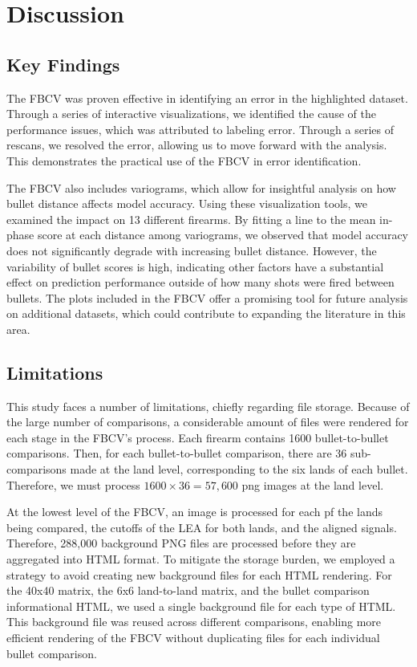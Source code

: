 \documentclass[
  12pt]{article}
\begin{document}
\section{Discussion}\label{discussion}

\subsection{Key Findings}\label{key-findings}

The FBCV was proven effective in identifying an error in the highlighted
dataset. Through a series of interactive visualizations, we identified
the cause of the performance issues, which was attributed to labeling
error. Through a series of rescans, we resolved the error, allowing us
to move forward with the analysis. This demonstrates the practical use
of the FBCV in error identification.

The FBCV also includes variograms, which allow for insightful analysis
on how bullet distance affects model accuracy. Using these visualization
tools, we examined the impact on 13 different firearms. By fitting a
line to the mean in-phase score at each distance among variograms, we
observed that model accuracy does not significantly degrade with
increasing bullet distance. However, the variability of bullet scores is
high, indicating other factors have a substantial effect on prediction
performance outside of how many shots were fired between bullets. The
plots included in the FBCV offer a promising tool for future analysis on
additional datasets, which could contribute to expanding the literature
in this area.

\subsection{Limitations}\label{limitations}

This study faces a number of limitations, chiefly regarding file
storage. Because of the large number of comparisons, a considerable
amount of files were rendered for each stage in the FBCV's process. Each
firearm contains 1600 bullet-to-bullet comparisons. Then, for each
bullet-to-bullet comparison, there are 36 sub-comparisons made at the
land level, corresponding to the six lands of each bullet. Therefore, we
must process \(1600 \times 36 = 57,600\) png images at the land level.

At the lowest level of the FBCV, an image is processed for each pf the
lands being compared, the cutoffs of the LEA for both lands, and the
aligned signals. Therefore, 288,000 background PNG files are processed
before they are aggregated into HTML format. To mitigate the storage
burden, we employed a strategy to avoid creating new background files
for each HTML rendering. For the 40x40 matrix, the 6x6 land-to-land
matrix, and the bullet comparison informational HTML, we used a single
background file for each type of HTML. This background file was reused
across different comparisons, enabling more efficient rendering of the
FBCV without duplicating files for each individual bullet comparison.
\end{document}
